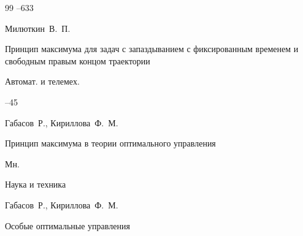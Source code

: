 \begin{thebibliography}{99}
--633



















\by Милюткин~В.~П.

\paper Принцип максимума для задач с запаздыванием с фиксированным временем и свободным правым концом траектории

\jour Автомат. и телемех.



--45






\by Габасов~Р., Кириллова~Ф.~М. 

\book Принцип максимума в теории оптимального управления

\publaddr Мн.

\publ Наука и техника






\by Габасов~Р., Кириллова~Ф.~М. 

\book Особые оптимальные управления


\end{thebibliography}
